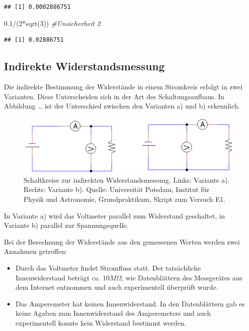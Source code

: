 \documentclass[
  9pt,
]{article}
\newenvironment{Shaded}{\begin{snugshade}}{\end{snugshade}}
\newcommand{\CommentTok}[1]{\textcolor[rgb]{0.56,0.35,0.01}{\textit{#1}}}
\newcommand{\DecValTok}[1]{\textcolor[rgb]{0.00,0.00,0.81}{#1}}
\newcommand{\FloatTok}[1]{\textcolor[rgb]{0.00,0.00,0.81}{#1}}
\newcommand{\FunctionTok}[1]{\textcolor[rgb]{0.00,0.00,0.00}{#1}}
\newcommand{\NormalTok}[1]{#1}
\newcommand{\SpecialCharTok}[1]{\textcolor[rgb]{0.00,0.00,0.00}{#1}}
\begin{document}
\begin{verbatim}
## [1] 0.0002886751
\end{verbatim}

\begin{Shaded}
\begin{Highlighting}[]
\FloatTok{0.1}\SpecialCharTok{/}\NormalTok{(}\DecValTok{2}\SpecialCharTok{*}\FunctionTok{sqrt}\NormalTok{(}\DecValTok{3}\NormalTok{)) }\CommentTok{\#Unsicherheit 2}
\end{Highlighting}
\end{Shaded}

\begin{verbatim}
## [1] 0.02886751
\end{verbatim}

\hypertarget{indirekte-widerstandsmessung}{%
\subsection{Indirekte
Widerstandsmessung}\label{indirekte-widerstandsmessung}}

Die indirekte Bestimmung der Widerstände in einem Stromkreis erfolgt in
zwei Varianten. Diese Unterscheiden sich in der Art des
Schaltungsaufbaus. In Abbildung \ldots{} ist der Unterschied zwischen
den Varianten a) und b) erkennlich.

\begin{figure}
\centering
\includegraphics[width=\textwidth,height=0.1\textheight]{Bilder/Schaltkreis.png}
\caption{Schaltkreise zur indirekten Widerstandsmessung. Links: Variante
a). Rechts: Variante b). Quelle: Universität Potsdam, Institut für
Physik und Astronomie, Grundpraktikum, Skript zum Versuch E1.}
\end{figure}

In Variante a) wird das Voltmeter parallel zum Widerstand geschaltet, in
Variante b) parallel zur Spannungsquelle.

Bei der Berechnung der Widerstände aus den gemessenen Werten werden zwei
Annahmen getroffen:

\begin{itemize}
  \item Durch das Voltmeter findet Stromfluss statt. Der tatsächliche Innenwiderstand beträgt ca. $10M\Omega$, wie Datenblättern des Messgerätes aus dem Internet entnommen und auch experimentell überprüft wurde.
  \item Das Amperemeter hat keinen Innenwiderstand. In den Datenblättern gab es keine Agaben zum Innenwiderstand des Amperemeters und auch experimentell konnte kein Widerstand bestimmt werden.
\end{itemize}
\end{document}
